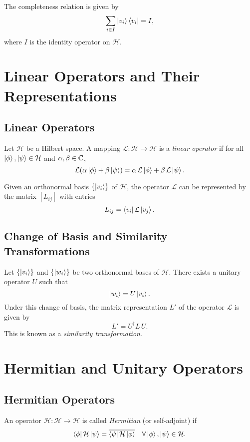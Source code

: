 	The completeness relation is given by
	\[
	\sum_{i\in I} \left| v_i \right\rangle\left\langle v_i \right| = I,
	\]
	where \( I \) is the identity operator on \(\mathcal{H}\).
	
	\chapter{Linear Operators and Their Representations}
	
	\section{Linear Operators}
	\begin{definition}
		Let \(\mathcal{H}\) be a Hilbert space. A mapping \(\mathcal{L}:\mathcal{H} \to \mathcal{H}\) is a \emph{linear operator} if for all \(\left| \phi \right\rangle, \left| \psi \right\rangle \in \mathcal{H}\) and \(\alpha, \beta \in \mathbb{C}\),
		\[
		\mathcal{L}(\alpha\left| \phi \right\rangle + \beta\left| \psi \right\rangle) = \alpha\,\mathcal{L}\left| \phi \right\rangle + \beta\,\mathcal{L}\left| \psi \right\rangle.
		\]
	\end{definition}
	
	Given an orthonormal basis \(\{\left| v_i \right\rangle\}\) of \(\mathcal{H}\), the operator \(\mathcal{L}\) can be represented by the matrix \( [L_{ij}] \) with entries
	\[
	L_{ij} = \left\langle v_i \right|\mathcal{L}\left| v_j \right\rangle.
	\]
	
	\section{Change of Basis and Similarity Transformations}
	Let \(\{\left| v_i \right\rangle\}\) and \(\{\left| w_i \right\rangle\}\) be two orthonormal bases of \(\mathcal{H}\). There exists a unitary operator \( U \) such that
	\[
	\left| w_i \right\rangle = U\left| v_i \right\rangle.
	\]
	Under this change of basis, the matrix representation \( L' \) of the operator \( \mathcal{L} \) is given by
	\[
	L' = U^\dagger L\,U.
	\]
	This is known as a \emph{similarity transformation}.
	
	\chapter{Hermitian and Unitary Operators}
	
	\section{Hermitian Operators}
	\begin{definition}
		An operator \(\mathcal{H}:\mathcal{H}\to\mathcal{H}\) is called \emph{Hermitian} (or self-adjoint) if
		\[
		\left\langle \phi \right|\mathcal{H}\left| \psi \right\rangle = \overline{\left\langle \psi \right|\mathcal{H}\left| \phi \right\rangle} \quad \forall \left| \phi \right\rangle,\left| \psi \right\rangle\in\mathcal{H}.
		\]
	\end{definition}
	
